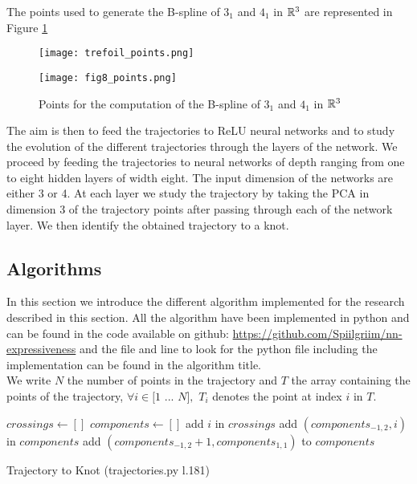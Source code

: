 \documentclass[12pt, a4paper]{article}
\begin{document}
The points used to generate the B-spline of $3_1$ and $4_1$ in $\mathbb{R}^3$ are represented in Figure \ref{fig:bspline_points}

\begin{figure}[H]
  \begin{minipage}[c]{.5\linewidth}
             \centering
            \texttt{[image: trefoil\_points.png]}
         \end{minipage}
         \hfill%
         \begin{minipage}[c]{.5\linewidth}
             \centering
             \texttt{[image: fig8\_points.png]}
        \end{minipage}
        \caption{Points for the computation of the B-spline of $3_1$ and $4_1$ in $\mathbb{R}^3$}
        \label{fig:bspline_points}
\end{figure}

The aim is then to feed the trajectories to ReLU neural networks and to study the evolution of the different trajectories through the layers of the network. We proceed by feeding the trajectories to neural networks of depth ranging from one to eight hidden layers of width eight. The input dimension of the networks are either 3 or 4. At each layer we study the trajectory by taking the PCA in dimension 3 of the trajectory points after passing through each of the network layer. We then identify the obtained trajectory to a knot.\\

\subsection{Algorithms}

In this section we introduce the different algorithm implemented for the research described in this section. All the algorithm have been implemented in python and can be found in the code available on github: \url{https://github.com/Spiilgriim/nn-expressiveness} and the file and line to look for the python file including the implementation can be found in the algorithm title.\\

We write $N$ the number of points in the trajectory and $T$ the array containing the points of the trajectory, $\forall i \in [1$ $...$ $N],$  $T_i$ denotes the point at index $i$ in $T$.\\

\begin{algorithm}[H]
  \begin{algorithmic}[1]
    \STATE $crossings \gets []$
    \STATE $components \gets []$
    \STATE add $i$ in $crossings$
    \STATE add $(components_{-1,2},i)$ in $components$
    \ENDIF
    \ENDIF
    \ENDFOR
    \ENDFOR
    \STATE add $(components_{-1,2} + 1, components_{1,1})$ to $components$
  \end{algorithmic}
  \caption{Trajectory to Knot ({\selectfont trajectories.py l.181})}
  \label{alg:traj_to_knot}
\end{algorithm}
\end{document}
